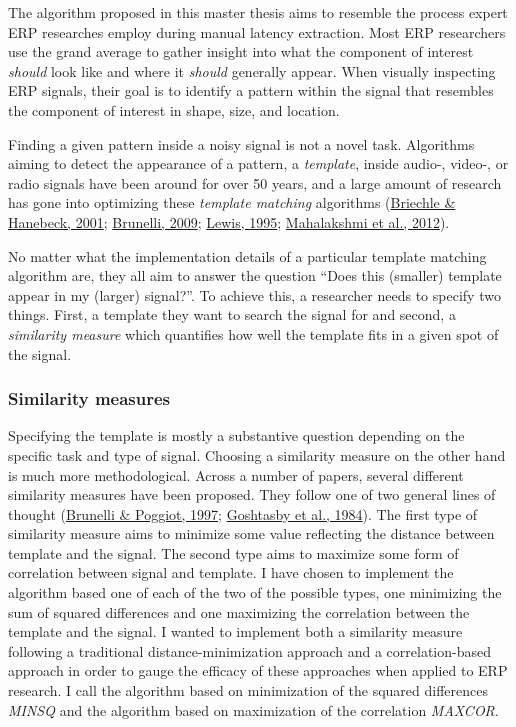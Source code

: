 \documentclass[
  man]{apa7}
\begin{document}
The algorithm proposed in this master thesis aims to resemble the process expert ERP researches employ during manual latency extraction. Most ERP researchers use the grand average to gather insight into what the component of interest \emph{should} look like and where it \emph{should} generally appear. When visually inspecting ERP signals, their goal is to identify a pattern within the signal that resembles the component of interest in shape, size, and location.

Finding a given pattern inside a noisy signal is not a novel task. Algorithms aiming to detect the appearance of a pattern, a \emph{template}, inside audio-, video-, or radio signals have been around for over 50 years, and a large amount of research has gone into optimizing these \emph{template matching} algorithms (\protect\hyperlink{ref-briechle2001template}{Briechle \& Hanebeck, 2001}; \protect\hyperlink{ref-brunelli2009template}{Brunelli, 2009}; \protect\hyperlink{ref-lewis1995fast}{Lewis, 1995}; \protect\hyperlink{ref-mahalakshmi2012image}{Mahalakshmi et al., 2012}).

No matter what the implementation details of a particular template matching algorithm are, they all aim to answer the question ``Does this (smaller) template appear in my (larger) signal?''. To achieve this, a researcher needs to specify two things. First, a template they want to search the signal for and second, a \emph{similarity measure} which quantifies how well the template fits in a given spot of the signal.

\hypertarget{similarity-measures}{%
\subsubsection{Similarity measures}\label{similarity-measures}}

Specifying the template is mostly a substantive question depending on the specific task and type of signal. Choosing a similarity measure on the other hand is much more methodological. Across a number of papers, several different similarity measures have been proposed. They follow one of two general lines of thought (\protect\hyperlink{ref-brunelli1997template}{Brunelli \& Poggiot, 1997}; \protect\hyperlink{ref-goshtasby1984two}{Goshtasby et al., 1984}). The first type of similarity measure aims to minimize some value reflecting the distance between template and the signal. The second type aims to maximize some form of correlation between signal and template. I have chosen to implement the algorithm based one of each of the two of the possible types, one minimizing the sum of squared differences and one maximizing the correlation between the template and the signal. I wanted to implement both a similarity measure following a traditional distance-minimization approach and a correlation-based approach in order to gauge the efficacy of these approaches when applied to ERP research. I call the algorithm based on minimization of the squared differences \emph{MINSQ} and the algorithm based on maximization of the correlation \emph{MAXCOR}.
\end{document}
